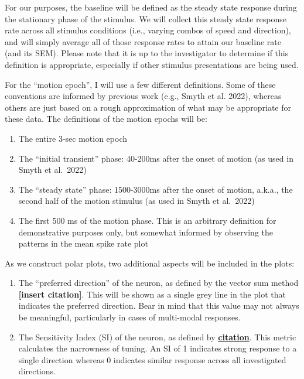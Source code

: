 \documentclass[
]{book}
\providecommand{\tightlist}{%
  \setlength{\itemsep}{0pt}\setlength{\parskip}{0pt}}
\begin{document}
For our purposes, the baseline will be defined as the steady state
response during the stationary phase of the stimulus. We will collect
this steady state response rate across all stimulus conditions (i.e.,
varying combos of speed and direction), and will simply average all of
those response rates to attain our baseline rate (and its SEM). Please
note that it is up to the investigator to determine if this definition
is appropriate, especially if other stimulus presentations are being
used.

For the ``motion epoch'', I will use a few different definitions. Some
of these conventions are informed by previous work (e.g., Smyth et al.
2022), whereas others are just based on a rough approximation of what
may be appropriate for these data. The definitions of the motion
epochs will be:

\begin{enumerate}
\def\labelenumi{\arabic{enumi}.}
\tightlist
\item
  The entire 3-sec motion epoch
\item
  The ``initial transient'' phase: 40-200ms after the onset of
  motion (as used in Smyth et al.~2022)
\item
  The ``steady state'' phase: 1500-3000ms after the onset of motion,
  a.k.a., the second half of the motion stimulus (as used in Smyth
  et al.~2022)
\item
  The first 500 ms of the motion phase. This is an arbitrary
  definition for demonstrative purposes only, but somewhat informed
  by observing the patterns in the mean spike rate plot
\end{enumerate}

As we construct polar plots, two additional aspects will be included
in the plots:

\begin{enumerate}
\def\labelenumi{\arabic{enumi}.}
\tightlist
\item
  The ``preferred direction'' of the neuron, as defined by the vector
  sum method \textbf{{[}insert citation{]}}. This will be shown as a single
  grey line in the plot that indicates the preferred direction. Bear
  in mind that this value may not always be meaningful, particularly
  in cases of multi-modal responses.
\item
  The Sensitivity Index (SI) of the neuron, as defined by
  \textbf{\protect\hyperlink{citation}{citation}}. This metric calculates the narrowness of tuning.
  An SI of 1 indicates strong response to a single direction whereas
  0 indicates similar response across all investigated directions.
\end{enumerate}
\end{document}
